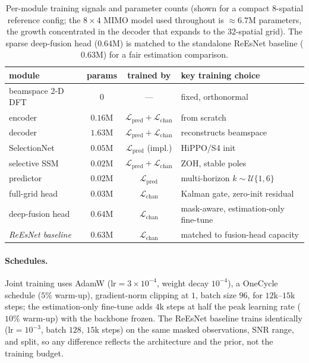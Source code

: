 \documentclass[11pt]{article}
\begin{document}
\begin{table}[h]
\centering
\small
\begin{tabular}{lccl}
\toprule
module & params & trained by & key training choice \\
\midrule
beamspace 2-D DFT & $0$ & --- & fixed, orthonormal \\
encoder & $0.16$M & $\mathcal L_{\text{pred}}+\mathcal L_{\text{chan}}$ & from scratch \\
decoder & $1.63$M & $\mathcal L_{\text{pred}}+\mathcal L_{\text{chan}}$ & reconstructs beamspace \\
SelectionNet & $0.05$M & $\mathcal L_{\text{pred}}$ (impl.) & HiPPO/S4 init \\
selective SSM & $0.02$M & $\mathcal L_{\text{pred}}+\mathcal L_{\text{chan}}$ & ZOH, stable poles \\
predictor & $0.02$M & $\mathcal L_{\text{pred}}$ & multi-horizon $k\!\sim\!\mathcal U\{1,6\}$ \\
full-grid head & $0.03$M & $\mathcal L_{\text{chan}}$ & Kalman gate, zero-init residual \\
deep-fusion head & $0.64$M & $\mathcal L_{\text{chan}}$ & mask-aware, estimation-only fine-tune \\
\midrule
\emph{ReEsNet baseline} & $0.63$M & $\mathcal L_{\text{chan}}$ & matched to fusion-head capacity \\
\bottomrule
\end{tabular}
\caption{Per-module training signals and parameter counts (shown for a compact $8$-spatial reference
config; the $8\times4$ MIMO model used throughout is $\approx$$6.7$M parameters, the growth
concentrated in the decoder that expands to the $32$-spatial grid). The sparse deep-fusion head
($0.64$M) is matched to the standalone ReEsNet baseline ($0.63$M) for a fair estimation comparison.}
\label{tab:modules}
\end{table}

\paragraph{Schedules.} Joint training uses AdamW ($\text{lr}=3{\times}10^{-4}$, weight decay
$10^{-4}$), a OneCycle schedule ($5\%$ warm-up), gradient-norm clipping at $1$, batch size $96$, for
$12$k--$15$k steps; the estimation-only fine-tune adds $4$k steps at half the peak learning rate
($10\%$ warm-up) with the backbone frozen. The ReEsNet baseline trains identically
($\text{lr}=10^{-3}$, batch $128$, $15$k steps) on the same masked observations, SNR range, and split,
so any difference reflects the architecture and the prior, not the training budget.
\end{document}
